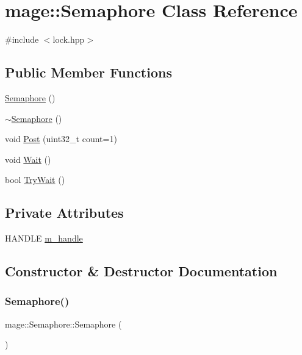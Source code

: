 \hypertarget{classmage_1_1_semaphore}{}\section{mage\+:\+:Semaphore Class Reference}
\label{classmage_1_1_semaphore}


{\ttfamily \#include $<$lock.\+hpp$>$}

\subsection*{Public Member Functions}
\begin{DoxyCompactItemize}
\item 
\hyperlink{classmage_1_1_semaphore_a7b4f53c18b9a244ed98ef58fa5cfa2bb}{Semaphore} ()
\item 
\hyperlink{classmage_1_1_semaphore_a991ed365c28e4a9c63ff34a5efeb012d}{$\sim$\+Semaphore} ()
\item 
void \hyperlink{classmage_1_1_semaphore_a354ea9743f9794b14a3f032e0443b214}{Post} (uint32\+\_\+t count=1)
\item 
void \hyperlink{classmage_1_1_semaphore_ae63599939b6bcc3939cbeddd7ffa5f66}{Wait} ()
\item 
bool \hyperlink{classmage_1_1_semaphore_ab34cdf4e9b7388dbdb30aab167c074f6}{Try\+Wait} ()
\end{DoxyCompactItemize}
\subsection*{Private Attributes}
\begin{DoxyCompactItemize}
\item 
H\+A\+N\+D\+LE \hyperlink{classmage_1_1_semaphore_ac1ded856984b4ac3739d9ff627838fda}{m\+\_\+handle}
\end{DoxyCompactItemize}


\subsection{Constructor \& Destructor Documentation}
\hypertarget{classmage_1_1_semaphore_a7b4f53c18b9a244ed98ef58fa5cfa2bb}{}\label{classmage_1_1_semaphore_a7b4f53c18b9a244ed98ef58fa5cfa2bb} 
\subsubsection{\texorpdfstring{Semaphore()}{Semaphore()}}
{\footnotesize\ttfamily mage\+::\+Semaphore\+::\+Semaphore (\begin{DoxyParamCaption}{ }\end{DoxyParamCaption})}

